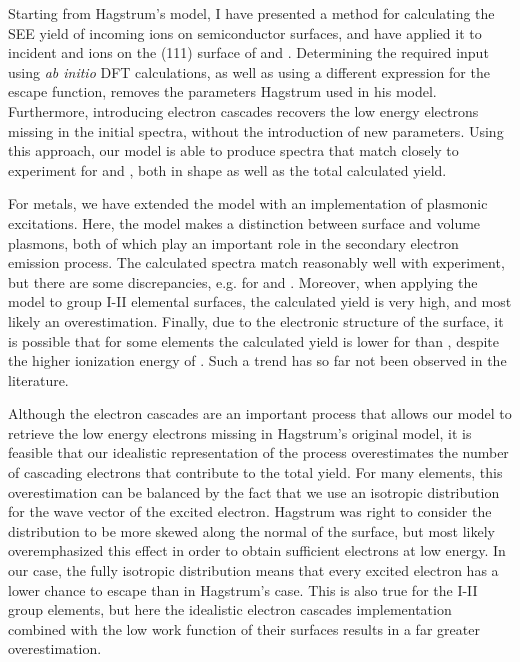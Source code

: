 \begin{refsection}
Starting from Hagstrum's model, I have presented a method for calculating the 
SEE yield of incoming ions on semiconductor surfaces, and have applied it to 
incident  and  ions on the (111) surface of  and 
. Determining the required input using \textit{ab initio} DFT 
calculations, as well as using a different expression for the escape function, 
removes the parameters Hagstrum used in his model. Furthermore, introducing 
electron cascades recovers the low energy electrons missing in the initial spectra,
without the introduction of new parameters. Using this approach, our model is 
able to produce spectra that match closely to experiment for  and 
, both in shape as well as the total calculated yield.

For metals, we have extended the model with an implementation of plasmonic 
excitations. Here, the model makes a distinction between surface and volume 
plasmons, both of which play an important role in the secondary electron emission 
process. The calculated spectra match reasonably well with experiment, but there 
are some discrepancies, e.g. for  and . Moreover, when applying the 
model to group I-II elemental surfaces, the calculated yield is very high, and 
most likely an overestimation. Finally, due to the electronic structure of the 
surface, it is possible that for some elements the calculated yield is lower 
for  than , despite the higher ionization energy of . Such 
a trend has so far not been observed in the literature.

Although the electron cascades are an important process that allows our model
to retrieve the low energy electrons missing in Hagstrum's original model, it 
is feasible that our idealistic representation of the process overestimates 
the number of cascading electrons that contribute to the total yield. For many 
elements, this overestimation can be balanced by the fact that we use an isotropic 
distribution for the wave vector of the excited electron. Hagstrum was right to
consider the distribution to be more skewed along the normal of the surface, but 
most likely overemphasized this effect in order to obtain sufficient electrons
at low energy. In our case, the fully isotropic distribution means that every 
excited electron has a lower chance to escape than in Hagstrum's case. This is
also true for the I-II group elements, but here the idealistic electron cascades 
implementation combined with the low work function of their surfaces 
results in a far greater overestimation.


\end{refsection}
